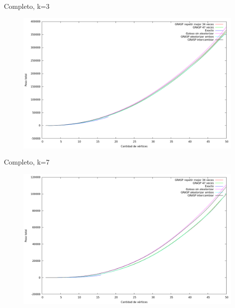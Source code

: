 \vspace*{0.5cm}

Completo, k=3
\vspace*{0.5cm}

\begin{figure}[h]
  \begin{center}
    \includegraphics[scale=0.35]{imagenes/ej6-completo-k3-peso.png}
  \end{center}
\end{figure}

\vspace*{0.5cm}

Completo, k=7
\vspace*{0.5cm}

\begin{figure}[h]
  \begin{center}
    \includegraphics[scale=0.35]{imagenes/ej6-completo-k7-peso.png}
  \end{center}
\end{figure}

